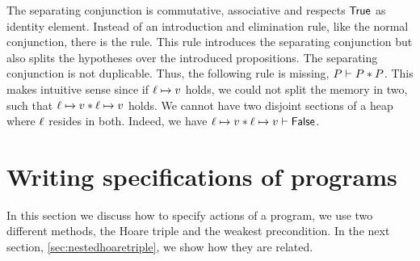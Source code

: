 \documentclass[thesis.tex]{subfiles}
\begin{document}
The separating conjunction is commutative, associative and respects $\textsf{\upshape True}$ as identity element. Instead of an introduction and elimination rule, like the normal conjunction, there is the  rule. This rule introduces the separating conjunction but also splits the hypotheses over the introduced propositions. The separating conjunction is not duplicable. Thus, the following rule is missing, $P \vdash P * P$. This makes intuitive sense since if $\loc\fmapsto\val$ holds, we could not split the memory in two, such that $\loc\fmapsto\val * \loc\fmapsto\val$ holds. We cannot have two disjoint sections of a heap where $\ell$ resides in both. Indeed, we have $\loc\fmapsto\val * \loc\fmapsto\val \proves \FALSE$.

\section{Writing specifications of programs}
\label{sec:Hoare}
In this section we discuss how to specify actions of a program, we use two different methods, the Hoare triple and the weakest precondition. In the next section, \cref{sec:nestedhoaretriple}, we show how they are related.
\end{document}
